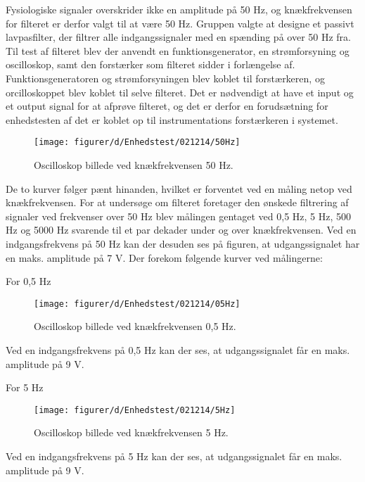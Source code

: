 Fysiologiske signaler overskrider ikke en amplitude på 50 Hz, og knækfrekvensen for filteret er derfor valgt til at være 50 Hz. 
Gruppen valgte at designe et passivt lavpasfilter, der filtrer alle indgangssignaler med en spænding på over 50 Hz fra.
Til test af filteret blev der anvendt en funktionsgenerator, en strømforsyning og oscilloskop, samt den forstærker som filteret sidder i forlængelse af. Funktionsgeneratoren og strømforsyningen blev koblet til forstærkeren, og orcilloskoppet blev koblet til selve filteret. Det er nødvendigt at have et input og et output signal for at afprøve filteret, og det er derfor en forudsætning for enhedstesten af det er koblet op til instrumentations forstærkeren i systemet.

\begin{figure}[H]
    \centering
    \texttt{[image: figurer/d/Enhedstest/021214/50Hz]}
    \caption{Oscilloskop billede ved knækfrekvensen 50 Hz.}
    \label{figtest_50Hz}
\end{figure}

De to kurver følger pænt hinanden, hvilket er forventet ved en måling netop ved knækfrekvensen.
For at undersøge om filteret foretager den ønskede filtrering af signaler ved frekvenser over 50 Hz blev målingen gentaget ved 0,5 Hz, 5 Hz, 500 Hz og 5000 Hz svarende til et par dekader under og over knækfrekvensen.
Ved en indgangsfrekvens på 50 Hz kan der desuden ses på figuren, at udgangssignalet har en maks. amplitude på 7 V.
Der forekom følgende kurver ved målingerne:

For 0,5 Hz

\begin{figure}[H]
    \centering
    \texttt{[image: figurer/d/Enhedstest/021214/05Hz]}
    \caption{Oscilloskop billede ved knækfrekvensen 0,5 Hz.}
    \label{figtest_50Hz}
\end{figure}

Ved en indgangsfrekvens på 0,5 Hz kan der ses, at udgangssignalet får en maks. amplitude på 9 V.

For 5 Hz

\begin{figure}[H]
    \centering
    \texttt{[image: figurer/d/Enhedstest/021214/5Hz]}
    \caption{Oscilloskop billede ved knækfrekvensen 5 Hz.}
    \label{figtest_50Hz}
\end{figure}

Ved en indgangsfrekvens på 5 Hz kan der ses, at udgangssignalet får en maks. amplitude på 9 V.

